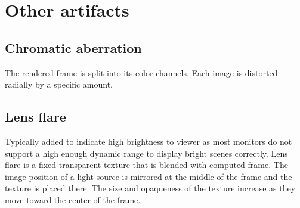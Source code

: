 \chapter{Other artifacts}
\section{Chromatic aberration}
\label{ch:Content2:sec:Section1}
The rendered frame is split into its color channels.
Each image is distorted radially by a specific amount.

\section{Lens flare}
\label{ch:Content2:sec:Section2}
Typically added to indicate high brightness to viewer as most monitors do not support a high enough dynamic range to display bright scenes correctly.
Lens flare is a fixed transparent texture that is blended with computed frame.
The image position of a light source is mirrored at the middle of the frame and the texture is placed there.
The size and opaqueness of the texture increase as they move toward the center of the frame.